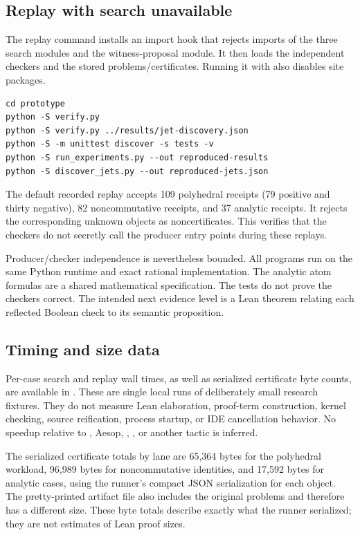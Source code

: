 \subsection{Replay with search unavailable}
The replay command installs an import hook that rejects imports of the three search modules and the witness-proposal module. It then loads the independent checkers and the stored problems/certificates. Running it with  also disables site packages.
\par\noindent\begin{minipage}{\linewidth}
\begin{lstlisting}
cd prototype
python -S verify.py
python -S verify.py ../results/jet-discovery.json
python -S -m unittest discover -s tests -v
python -S run_experiments.py --out reproduced-results
python -S discover_jets.py --out reproduced-jets.json
\end{lstlisting}
\end{minipage}\par
The default recorded replay accepts 109 polyhedral receipts (79 positive and thirty negative), 82 noncommutative receipts, and 37 analytic receipts. It rejects the corresponding unknown objects as noncertificates. This verifies that the checkers do not secretly call the producer entry points during these replays.

Producer/checker independence is nevertheless bounded. All programs run on the same Python runtime and exact rational implementation. The analytic atom formulas are a shared mathematical specification. The tests do not prove the checkers correct. The intended next evidence level is a Lean theorem relating each reflected Boolean check to its semantic proposition.

\subsection{Timing and size data}
Per-case search and replay wall times, as well as serialized certificate byte counts, are available in . These are single local runs of deliberately small research fixtures. They do not measure Lean elaboration, proof-term construction, kernel checking, source reification, process startup, or IDE cancellation behavior. No speedup relative to \grind{}, Aesop, , , or another tactic is inferred.

The serialized certificate totals by lane are 65,364 bytes for the polyhedral workload, 96,989 bytes for noncommutative identities, and 17,592 bytes for analytic cases, using the runner's compact JSON serialization for each object. The pretty-printed artifact file also includes the original problems and therefore has a different size. These byte totals describe exactly what the runner serialized; they are not estimates of Lean proof sizes.

